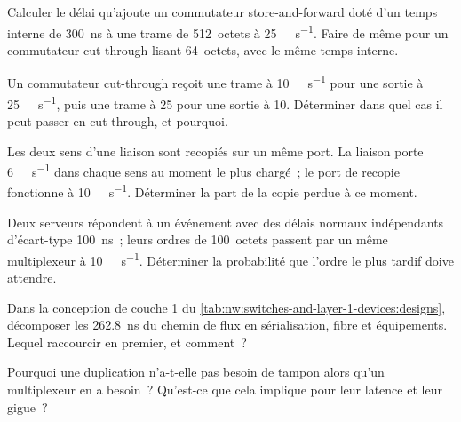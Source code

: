 \begin{exercise}[$\star$]\label{exo:nw:switches-and-layer-1-devices:1}
Calculer le délai qu'ajoute un commutateur store-and-forward doté d'un temps interne de \qty{300}{\nano\second} à une trame de 512~octets à
\qty{25}{\giga\bit\per\second}. Faire de même pour un commutateur cut-through lisant 64~octets, avec le même temps interne.
\end{exercise}

\begin{exercise}[$\star$]\label{exo:nw:switches-and-layer-1-devices:2}
Un commutateur cut-through reçoit une trame à \qty{10}{\giga\bit\per\second} pour une sortie à \qty{25}{\giga\bit\per\second}, puis une trame à
25 pour une sortie à 10. Déterminer dans quel cas il peut passer en cut-through, et pourquoi.
\end{exercise}

\begin{exercise}[$\star$]\label{exo:nw:switches-and-layer-1-devices:3}
Les deux sens d'une liaison sont recopiés sur un même port. La liaison porte \qty{6}{\giga\bit\per\second} dans chaque sens au moment le plus chargé~;
le port de recopie fonctionne à \qty{10}{\giga\bit\per\second}. Déterminer la part de la copie perdue à ce moment.
\end{exercise}

\begin{exercise}[$\star\star$]\label{exo:nw:switches-and-layer-1-devices:4}
Deux serveurs répondent à un événement avec des délais normaux indépendants d'écart-type \qty{100}{\nano\second}~; leurs ordres de 100~octets passent
par un même multiplexeur à \qty{10}{\giga\bit\per\second}. Déterminer la probabilité que l'ordre le plus tardif doive attendre.
\end{exercise}

\begin{exercise}[$\star\star$]\label{exo:nw:switches-and-layer-1-devices:5}
Dans la conception de couche 1 du \cref{tab:nw:switches-and-layer-1-devices:designs}, décomposer les 262.8~ns du chemin de flux en sérialisation, fibre et équipements.
Lequel raccourcir en premier, et comment~?
\end{exercise}

\begin{exercise}[$\star\star$]\label{exo:nw:switches-and-layer-1-devices:6}
Pourquoi une duplication n'a-t-elle pas besoin de tampon alors qu'un multiplexeur en a besoin~? Qu'est-ce que cela implique pour leur latence et leur gigue~?
\end{exercise}

